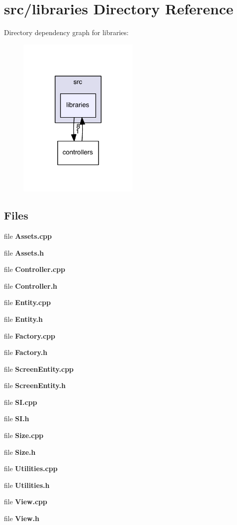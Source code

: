 \section{src/libraries Directory Reference}
\label{dir_588cd77586230d2c129f15f0bca2b9b2}
Directory dependency graph for libraries\-:\nopagebreak
\begin{figure}[H]
\begin{center}
\leavevmode
\includegraphics[width=166pt]{dir_588cd77586230d2c129f15f0bca2b9b2_dep}
\end{center}
\end{figure}
\subsection*{Files}
\begin{DoxyCompactItemize}
\item 
file {\bf Assets.\-cpp}
\item 
file {\bf Assets.\-h}
\item 
file {\bf Controller.\-cpp}
\item 
file {\bf Controller.\-h}
\item 
file {\bf Entity.\-cpp}
\item 
file {\bf Entity.\-h}
\item 
file {\bf Factory.\-cpp}
\item 
file {\bf Factory.\-h}
\item 
file {\bf Screen\-Entity.\-cpp}
\item 
file {\bf Screen\-Entity.\-h}
\item 
file {\bf S\-I.\-cpp}
\item 
file {\bf S\-I.\-h}
\item 
file {\bf Size.\-cpp}
\item 
file {\bf Size.\-h}
\item 
file {\bf Utilities.\-cpp}
\item 
file {\bf Utilities.\-h}
\item 
file {\bf View.\-cpp}
\item 
file {\bf View.\-h}
\end{DoxyCompactItemize}

